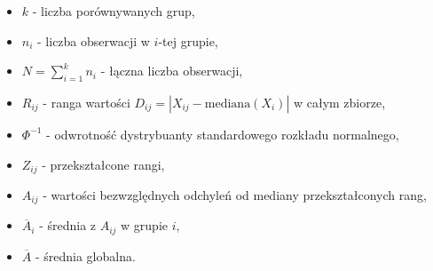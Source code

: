 \documentclass[12pt,a4paper]{article}
\begin{document}
\begin{itemize}
  \item $k$ - liczba porównywanych grup,
  \item $n_i$ - liczba obserwacji w $i$-tej grupie,
  \item $N = \sum_{i=1}^{k} n_i$ - łączna liczba obserwacji,
  \item $R_{ij}$ - ranga wartości $D_{ij} = |X_{ij} - \text{mediana}(X_i)|$ w całym zbiorze,
  \item $\Phi^{-1}$ - odwrotność dystrybuanty standardowego rozkładu normalnego,
  \item $Z_{ij}$ - przekształcone rangi,
  \item $A_{ij}$ - wartości bezwzględnych odchyleń od mediany przekształconych rang,
  \item $\overline{A}_i$ - średnia z $A_{ij}$ w grupie $i$, 
  \item $\overline{A}$ - średnia globalna.
\end{itemize}
\end{document}

